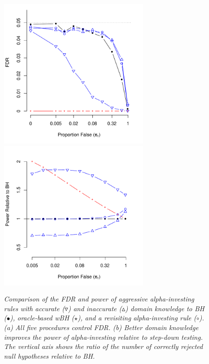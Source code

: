 \documentclass[12pt]{article}
\begin{document}
\begin{figure}
\caption{     \label{fi:fig2} \sl
Comparison of the FDR and power of aggressive alpha-investing rules with accurate ($\triangledown$) and inaccurate ($\vartriangle$) domain knowledge to BH ($\bullet$), oracle-based wBH ($\star$), and a revisiting alpha-investing rule ($\circ$).  (a) All five procedures control FDR. (b) Better domain knowledge improves the power of alpha-investing relative to step-down testing. The vertical axis shows the ratio of the number of correctly rejected null hypotheses relative to BH.
}
\centerline{ 	\includegraphics[width=3in]{figure2a}
			\includegraphics[width=3in]{figure2b}   }
\end{figure}
\end{document}
